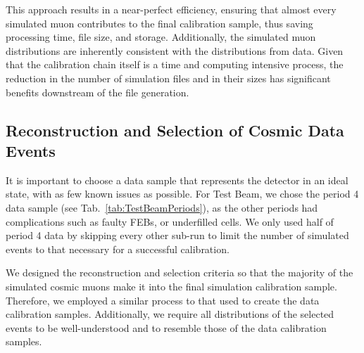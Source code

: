 This approach results in a near-perfect efficiency, ensuring that almost every simulated muon contributes to the final calibration sample, thus saving processing time, file size, and storage. Additionally, the simulated muon distributions are inherently consistent with the distributions from data. Given that the calibration chain itself is a time and computing intensive process, the reduction in the number of simulation files and in their sizes has significant benefits downstream of the file generation. 

\subsection{Reconstruction and Selection of Cosmic Data Events}\label{sec:CosmicGenAna}
It is important to choose a data sample that represents the detector in an ideal state, with as few known issues as possible. For Test Beam, we chose the period 4 data sample (see Tab.~\ref{tab:TestBeamPeriods}), as the other periods had complications such as faulty \glspl{FEB}, or underfilled cells. We only used half of period 4 data by skipping every other sub-run to limit the number of simulated events to that necessary for a successful calibration.


We designed the reconstruction and selection criteria so that the majority of the simulated cosmic muons make it into the final simulation calibration sample. Therefore, we employed a similar process to that used to create the data calibration samples. Additionally, we require all distributions of the selected events to be well-understood and to resemble those of the data calibration samples.

